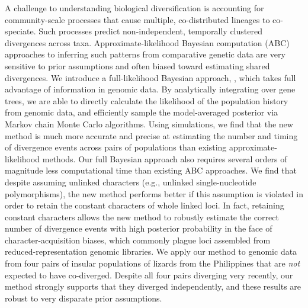 A challenge to understanding biological diversification is accounting for
community-scale processes that cause multiple, co-distributed lineages to
co-speciate.
Such processes predict non-independent, temporally clustered divergences across
taxa.
Approximate-likelihood Bayesian computation (ABC) approaches to inferring such
patterns from comparative genetic data are very sensitive to prior assumptions
and often biased toward estimating shared divergences.
We introduce a full-likelihood Bayesian approach, \ecoevolity, which takes full
advantage of information in genomic data.
By analytically integrating over gene trees, we are able to directly calculate
the likelihood of the population history from genomic data, and efficiently
sample the model-averaged posterior via Markov chain Monte Carlo algorithms.
Using simulations, we find that the new method is much more accurate and
precise at estimating the number and timing of divergence events across pairs
of populations than existing approximate-likelihood methods.
Our full Bayesian approach also requires several orders of magnitude less
computational time than existing ABC approaches.
We find that despite assuming unlinked characters (e.g., unlinked
single-nucleotide polymorphisms), the new method performs better if this
assumption is violated in order to retain the constant characters of whole
linked loci.
In fact, retaining constant characters allows the new method to robustly
estimate the correct number of divergence events with high posterior
probability in the face of character-acquisition biases, which commonly
plague loci assembled from reduced-representation genomic libraries.
We apply our method to genomic data from four pairs of insular populations of
 lizards from the Philippines that are \emph{not} expected to have
co-diverged.
Despite all four pairs diverging very recently, our method strongly supports
that they diverged independently, and these results are robust to very
disparate prior assumptions.
